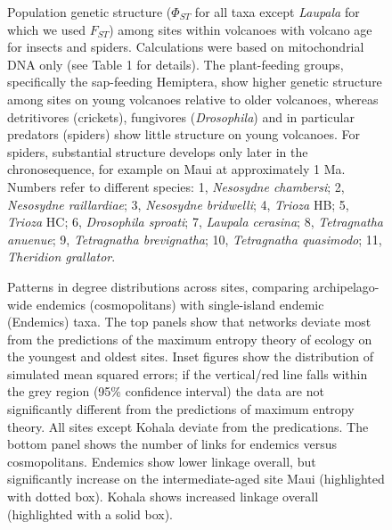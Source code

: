\begin{figure}[!hp]
  \centering
  \caption[Population genetic structure]{Population genetic structure
    ($\Phi_{ST}$ for all taxa except \textit{Laupala} for which we
    used $F_{ST}$) among sites within volcanoes with volcano age for
    insects and spiders. Calculations were based on mitochondrial DNA
    only (see Table 1 for details). The plant-feeding groups,
    specifically the sap-feeding Hemiptera, show higher genetic
    structure among sites on young volcanoes relative to older
    volcanoes, whereas detritivores (crickets), fungivores
    (\textit{Drosophila}) and in particular predators (spiders) show
    little structure on young volcanoes. For spiders, substantial
    structure develops only later in the chronosequence, for example
    on Maui at approximately 1 Ma. Numbers refer to different species:
    1, \textit{Nesosydne chambersi}; 2, \textit{Nesosydne
      raillardiae}; 3, \textit{Nesosydne bridwelli}; 4,
    \textit{Trioza} HB; 5, \textit{Trioza} HC; 6, \textit{Drosophila
      sproati}; 7, \textit{Laupala cerasina}; 8, \textit{Tetragnatha
      anuenue}; 9, \textit{Tetragnatha brevignatha}; 10,
    \textit{Tetragnatha quasimodo}; 11, \textit{Theridion grallator}.}
  \label{fig:popGen}
\end{figure}

\begin{figure}[!hp]
  \centering
  \caption[Patterns in degree distributions across sites]{Patterns in
    degree distributions across sites, comparing archipelago-wide
    endemics (cosmopolitans) with single-island endemic (Endemics)
    taxa. The top panels show that networks deviate most from the
    predictions of the maximum entropy theory of ecology on the
    youngest and oldest sites. Inset figures show the distribution of
    simulated mean squared errors; if the vertical/red line falls
    within the grey region (95\% confidence interval) the data are not
    significantly different from the predictions of maximum entropy
    theory. All sites except Kohala deviate from the predications. The
    bottom panel shows the number of links for endemics versus
    cosmopolitans. Endemics show lower linkage overall, but
    significantly increase on the intermediate-aged site Maui
    (highlighted with dotted box). Kohala shows increased linkage
    overall (highlighted with a solid box).}
  \label{fig:degree}
\end{figure}

